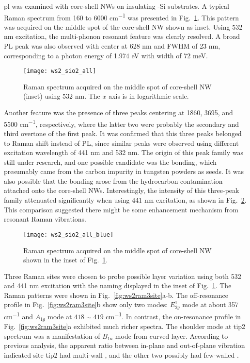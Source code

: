 \Gls{pl} was examined with core-shell NWs on insulating -Si substrates. A typical Raman spectrum from 160 to 6000 \si{cm^{-1}} was presented in Fig.~\ref{fig:ws2ramall}. This pattern was acquired on the middle spot of the core-shell NW shown as inset. Using 532 nm excitation, the multi-phonon resonant feature was clearly resolved. A broad PL peak was also observed with center at 628 nm and FWHM of 23 nm, corresponding to a photon energy of 1.974 eV with width of 72 meV.  
\begin{figure}[htb]
\centering
\texttt{[image: ws2\_sio2\_all]}
\caption[Raman spectrum acquired on the middle spot of core-shell NW (inset) using 532 nm. The $x$ axis is in logarithmic scale]{Raman spectrum acquired on the middle spot of core-shell NW (inset) using 532 nm. The $x$ axis is in logarithmic scale.}
\label{fig:ws2ramall}
\end{figure}
Another feature was the presence of three peaks centering at 1860, 3695, and 5500 \si{cm^{-1}}, respectively, where the latter two were probably the secondary and third overtone of the first peak. It was confirmed that this three peaks belonged to Raman shift instead of PL, since similar peaks were observed using different excitation wavelength of 441 nm and 532 nm. The origin of this peak family was still under research, and one possible candidate was the  bonding, which presumably came from the carbon impurity in tungsten powders as seeds. It was also possible that the  bonding arose from the hydrocarbon contamination attached onto the core-shell NWs. Interestingly, the intensity of this three-peak family attenuated significantly when using 441 nm excitation, as shown in Fig.~\ref{fig:ws2ramblue}. This comparison suggested there might be some enhancement mechanism from  resonant Raman vibrations. 
\begin{figure}[htb]
\centering
\texttt{[image: ws2\_sio2\_all\_blue]}
\caption[Raman spectrum acquired on the middle spot of core-shell NW shown in the inset of Fig.~\ref{fig:ws2ramall}]{Raman spectrum acquired on the middle spot of core-shell NW shown in the inset of Fig.~\ref{fig:ws2ramall}.}
\label{fig:ws2ramblue}
\end{figure}
Three Raman sites were chosen to probe possible layer variation using both 532 and 441 nm excitation with the naming displayed in the inset of Fig.~\ref{fig:ws2ramall}. The Raman patterns were shown in Fig.~\ref{fig:ws2ram3site}a-b. The off-resonance profile in Fig.~\ref{fig:ws2ram3site}b show only two modes: $E_{2g}^1$ mode at about 357 \si{cm^{-1}} and $A_{1g}$ mode at $418\sim419$ \si{cm^{-1}}. In contrast, the on-resonance profile in Fig.~\ref{fig:ws2ram3site}a exhibited much richer spectra. The shoulder mode at tip2 spectrum was a manifestation of $B_{1u}$ mode from curved  layer. According to previous analysis, the apparent ratio between in-plane and out-of-plane vibration indicated site tip2 had multi-wall , and the other two possibly had few-walled . 
